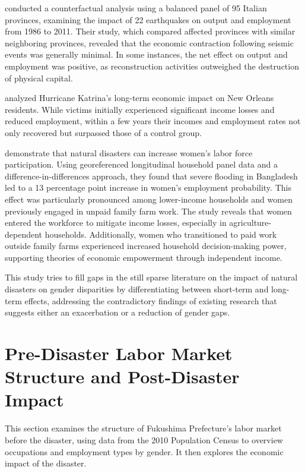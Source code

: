 \documentclass[a4paper,12pt]{article}
\begin{document}
 \citet{Porcelli2019TheItaly} conducted a counterfactual analysis using a balanced panel of 95 Italian provinces, examining the impact of 22 earthquakes on output and employment from 1986 to 2011. Their study, which compared affected provinces with similar neighboring provinces, revealed that the economic contraction following seismic events was generally minimal. In some instances, the net effect on output and employment was positive, as reconstruction activities outweighed the destruction of physical capital.

\citet{Deryugina2018TheReturns} analyzed Hurricane Katrina's long-term economic impact on New Orleans residents. While victims initially experienced significant income losses and reduced employment, within a few years their incomes and employment rates not only recovered but surpassed those of a control group.


\citet{Canessa2021WomensShocks} demonstrate that natural disasters can increase women's labor force participation. Using georeferenced longitudinal household panel data and a difference-in-differences approach, they found that severe flooding in Bangladesh led to a 13 percentage point increase in women's employment probability. This effect was particularly pronounced among lower-income households and women previously engaged in unpaid family farm work. The study reveals that women entered the workforce to mitigate income losses, especially in agriculture-dependent households. Additionally, women who transitioned to paid work outside family farms experienced increased household decision-making power, supporting theories of economic empowerment through independent income.

This study tries to fill gaps in the still sparse literature on the impact of natural disasters on gender disparities by differentiating between short-term and long-term effects, addressing the contradictory findings of existing research that suggests either an exacerbation or a reduction of gender gaps.


\section{Pre-Disaster Labor Market Structure and Post-Disaster Impact}
\label{sec4}

This section examines the structure of Fukushima Prefecture's labor market before the disaster, using data from the 2010 Population Census to overview occupations and employment types by gender. It then explores the economic impact of the disaster.
\end{document}
